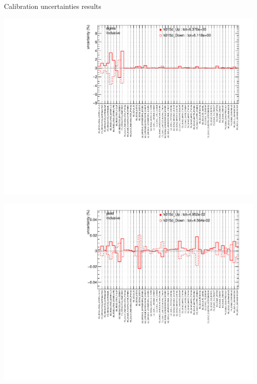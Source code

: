 \begin{frame}{Calibration uncertainties results}
  \begin{minipage}{0.49\linewidth}
    \includegraphics[width=\linewidth]{Figures/h015d_FULLMerge_catMerge_Systematics_Inclusive_sigma_sigma.pdf}
  \end{minipage}
  \hfill
  \begin{minipage}{0.49\linewidth}
    \includegraphics[width=\linewidth]{Figures/h015d_FULLMerge_catMerge_Systematics_Inclusive_yield_yield.pdf}
  \end{minipage}

\end{frame}
